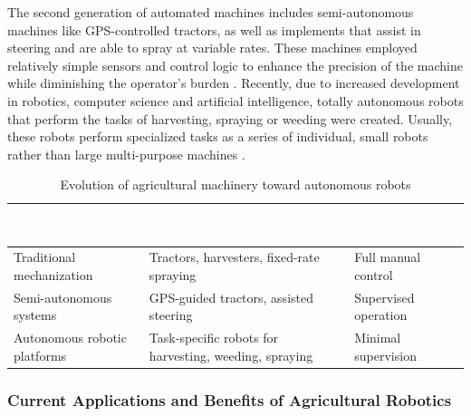 The second generation of automated machines includes semi-autonomous machines like GPS-controlled tractors, as well as implements that assist in steering and are able to spray at variable rates. These machines employed relatively simple sensors and control logic to enhance the precision of the machine while diminishing the operator's burden \cite{Pedersen2006}. Recently, due to increased development in robotics, computer science and artificial intelligence, totally autonomous robots that perform the tasks of harvesting, spraying or weeding were created. Usually, these robots perform specialized tasks as a series of individual, small robots rather than large multi-purpose machines \cite{Karkee2021}.


\begin{table}[H]
    \centering
    \caption{Evolution of agricultural machinery toward autonomous robots}
    \label{tab:evolution_robots}
    \small %
    \setlength{\extrarowheight}{4pt} %
    
    \begin{tabularx}{\textwidth}{l X X}
        \toprule
        \rowcolor[HTML]{2C3E50} %
        \textcolor{white}{\textbf{Stage}} & 
        \textcolor{white}{\textbf{Characteristics}} & 
        \textcolor{white}{\textbf{Human Involvement}} \\
        \midrule
        
        Traditional mechanization & 
        Tractors, harvesters, fixed-rate spraying & 
        Full manual control \\
        
        \rowcolor[HTML]{F2F4F4} %
        Semi-autonomous systems & 
        GPS-guided tractors, assisted steering & 
        Supervised operation \\
        
        Autonomous robotic platforms & 
        Task-specific robots for harvesting, weeding, spraying & 
        Minimal supervision \\
        \bottomrule
    \end{tabularx}
\end{table}

\subsubsection{Current Applications and Benefits of Agricultural Robotics}

